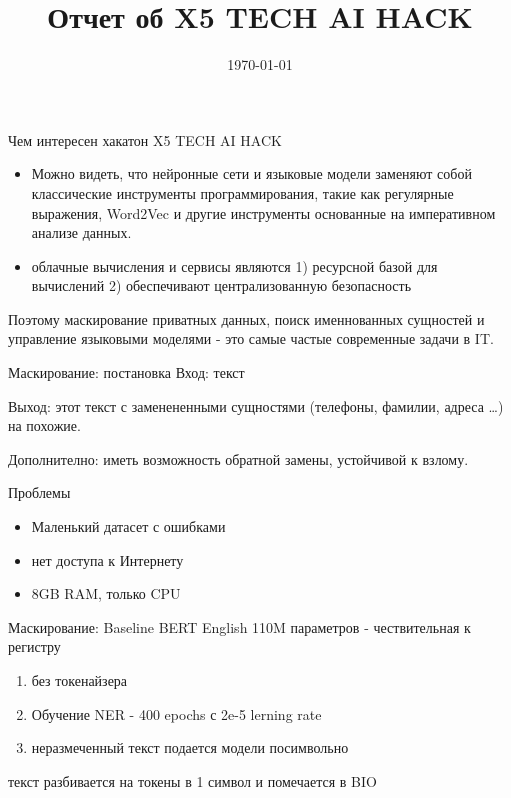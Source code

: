 \documentclass[presentation]{beamer}
\date{\today}
\title{Отчет об X5 TECH AI HACK}
\begin{document}
\maketitle


\begin{frame}[label={sec:org0d26e91}]{Чем интересен хакатон X5 TECH AI HACK}
\begin{itemize}
\item Можно видеть, что нейронные сети и языковые модели заменяют собой
классические инструменты программирования, такие как регулярные
выражения, Word2Vec и другие инструменты основанные на императивном
анализе данных.
\item облачные вычисления и сервисы являются 1) ресурсной базой для
вычислений 2) обеспечивают централизованную безопасность
\end{itemize}

Поэтому маскирование приватных данных, поиск именнованных сущностей и
 управление языковыми моделями - это самые частые современные задачи в
 IT.
\end{frame}
\begin{frame}[label={sec:orge8222f8}]{Маскирование: постановка}
Вход: текст

Выход: этот текст с заменененными сущностями (телефоны, фамилии,
 адреса \ldots{})  на похожие.

Дополнително: иметь возможность обратной замены, устойчивой к взлому.
\end{frame}
\begin{frame}[label={sec:orgef3c8b8}]{Проблемы}
\begin{itemize}
\item Маленький датасет с ошибками
\item нет доступа к Интернету
\item 8GB RAM, только CPU
\end{itemize}
\end{frame}
\begin{frame}[label={sec:org67b5f77}]{Маскирование: Baseline}
BERT English 110M параметров - чествительная к регистру
\begin{enumerate}
\item без токенайзера
\item Обучение NER - 400 epochs с 2e-5 lerning rate
\item неразмеченный текст подается модели посимвольно
\end{enumerate}

текст разбивается на токены в 1 символ и помечается в BIO
\end{frame}
\end{document}

